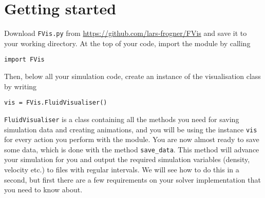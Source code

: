 \documentclass{article}
\newcommand{\ttt}[1]{\texttt{#1}}
\begin{document}
\section{Getting started}
\label{sec:start}
Download \ttt{FVis.py} from \url{https://github.com/lars-frogner/FVis} and save it to your working directory. At the top of your code, import the module by calling
\begin{lstlisting}
import FVis
\end{lstlisting}
Then, below all your simulation code, create an instance of the visualisation class by writing
\begin{lstlisting}
vis = FVis.FluidVisualiser()
\end{lstlisting}
\ttt{FluidVisualiser} is a class containing all the methods you need for saving simulation data and creating animations, and you will be using the instance \ttt{vis} for every action you perform with the module. You are now almost ready to save some data, which is done with the method \ttt{save\_data}. This method will advance your simulation for you and output the required simulation variables (density, velocity etc.) to files with regular intervals. We will see how to do this in a second, but first there are a few requirements on your solver implementation that you need to know about.
\end{document}
